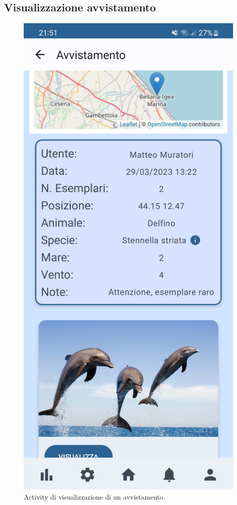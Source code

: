 \documentclass[a4paper,final,12pt]{report}
\begin{document}
\newpage
\subsection{Visualizzazione avvistamento}
\begin{figure}[hbtp]
\centering
\includegraphics[scale=0.11]{img_concettuale/vimob.jpg}
\caption{Activity di visualizzazione di un avvistamento.}
\label{figura:visavvdallapag}
\end{figure}
\end{document}

